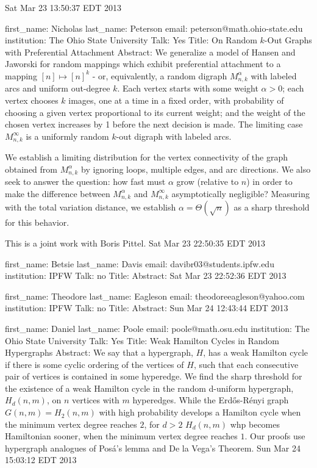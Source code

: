\documentclass{article}
\begin{document}
Sat Mar 23 13:50:37 EDT 2013

first_name: Nicholas
last_name: Peterson
email: peterson@math.ohio-state.edu
institution: The Ohio State University
Talk: Yes
Title: On Random $k$-Out Graphs with Preferential Attachment
Abstract: We generalize a model of Hansen and Jaworski for random mappings which exhibit preferential attachment to a mapping $[n]\mapsto[n]^k$ - or, equivalently, a random digraph $M_{n,k}^{\alpha}$ with labeled arcs and uniform out-degree $k$. Each vertex starts with some weight $\alpha>0$; each vertex chooses $k$ images, one at a time in a fixed order, with probability of choosing a given vertex proportional to its current weight; and the weight of the chosen vertex increases by 1 before the next decision is made.  The limiting case $M_{n,k}^{\infty}$ is a uniformly random $k$-out digraph with labeled arcs.

We establish a limiting distribution for the vertex connectivity of the graph obtained from $M_{n,k}^{\alpha}$ by ignoring loops, multiple edges, and arc directions. We also seek to answer the question: how fast must $\alpha$ grow (relative to $n$) in order to make the difference between $M_{n,k}^{\alpha}$ and $M_{n,k}^{\infty}$ asymptotically negligible?  Measuring with the total variation distance, we establish $\alpha=\Theta(\sqrt{n})$ as a sharp threshold for this behavior.

This is a joint work with Boris Pittel.
Sat Mar 23 22:50:35 EDT 2013

first_name: Betsie
last_name: Davis
email: davibr03@students.ipfw.edu
institution: IPFW
Talk: no
Title:
Abstract:
Sat Mar 23 22:52:36 EDT 2013

first_name: Theodore
last_name: Eagleson
email: theodoreeagleson@yahoo.com
institution: IPFW
Talk: no
Title:
Abstract:
Sun Mar 24 12:43:44 EDT 2013

first_name: Daniel
last_name: Poole
email: poole@math.osu.edu
institution: The Ohio State University
Talk: Yes
Title: Weak Hamilton Cycles in Random Hypergraphs
Abstract: We say that a hypergraph, $H$, has a weak Hamilton cycle if there is some
cyclic ordering of the vertices of $H$, such that each consecutive pair of
vertices is contained in some hyperedge. We find the sharp threshold for the
existence of a weak Hamilton cycle in the random d-uniform hypergraph,
$H_d(n,m)$, on $n$ vertices with $m$ hyperedges. While the
Erd\H{o}s-R\'{e}nyi graph $G(n,m)=H_2(n,m)$ with high probability develops a
Hamilton cycle when the minimum vertex degree reaches $2$, for $d>2$
$H_d(n,m)$ whp becomes Hamiltonian sooner, when the minimum vertex degree
reaches $1$. Our proofs use hypergraph analogues of Pos\'{a}'s lemma and De
la Vega's Theorem. 
Sun Mar 24 15:03:12 EDT 2013
\end{document}
